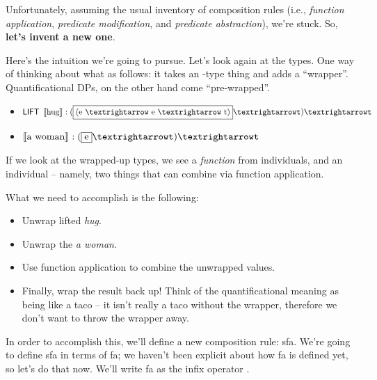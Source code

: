 \documentclass[nols,twoside,nofonts,nobib,nohyper,showframe]{tufte-handout}
\begin{document}
Unfortunately, assuming the usual inventory of composition rules (i.e.,
\textit{function application}, \textit{predicate modification}, and
\textit{predicate abstraction}), we're stuck. So, \textbf{let's invent a new one}.

Here's the intuition we're going to pursue. Let's look again at the types. One
way of thinking about what  as follows: it takes an -type thing
and adds a \enquote{wrapper}. Quantificational DPs, on the other hand come
\enquote{pre-wrapped}.

\begin{itemize}

    \item $\ml{LIFT} \eval{hug}: \type{(\fbox{(e → e → t)} → t) → t}$

    \item $\eval{a woman} : \type{(\fbox{e} → t) → t}$

\end{itemize}

If we look at the wrapped-up types, we see a \textit{function} from individuals,
and an individual -- namely, two things that can combine via function application.

What we need to accomplish is the following:

\begin{itemize}

  \item Unwrap lifted \textit{hug}.

  \item Unwrap the \textit{a woman}.

  \item Use function application to combine the unwrapped values.

  \item Finally, wrap the result back up! Think of the quantificational meaning as being
    like a taco -- it isn't really a taco without the wrapper, therefore we
    don't want to throw the wrapper away.

\end{itemize}

    In order to accomplish this, we'll define a new composition rule:
    \acf{sfa}. We're going to define \ac{sfa} in terms of \acf{fa}; we haven't been
      explicit about how \ac{fa} is defined yet, so let's do that now. We'll
      write \ac{fa} as the infix operator
      .
\end{document}
